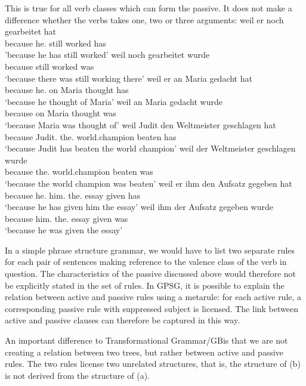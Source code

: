 \noindent
This is true for all verb classes which can form the passive. It does not make a difference whether the verbs takes one, two or three arguments:
\eal
\label{beispiel-arbeiten}
\ex 
\gll weil er noch gearbeitet hat\\
	 because he.\nom{} still worked has\\
\glt 'because he has still worked'
\ex 
\gll weil noch gearbeitet wurde\\
	 because still worked was\\
\glt `because there was still working there'
\zl
\eal
\label{beispiel-denken}
\ex 
\gll weil er an Maria gedacht hat\\
	 because he.\nom{} on Maria thought has\\
\glt `because he thought of Maria'
\ex 
\gll weil an Maria gedacht wurde\\
	 because on Maria thought was\\
\glt `because Maria was thought of'
\zl
\eal
\ex 
\gll weil Judit den Weltmeister geschlagen hat\\
     because Judit.\nom{} the.\acc{} world.champion beaten has\\
\glt `because Judit has beaten the world champion'
\ex 
\gll weil der Weltmeister geschlagen wurde\\
	 because the.\nom{} world.champion beaten was\\
\glt `because the world champion was beaten'
\zl
\eal
\ex 
\gll weil er ihm den Aufsatz gegeben hat\\
     because he.\nom{} him.\dat{} the.\acc{} essay given has\\
\glt `because he has given him the essay'
\ex 
\gll weil ihm der Aufsatz gegeben wurde\\
     because him.\dat{} the.\nom{} essay given was\\
\glt `because he was given the essay'
\zl

\noindent
In a simple phrase structure grammar, we would have to list  two separate rules for each pair of sentences making reference to the valence class of the
verb in question. The characteristics of the passive discussed above would therefore not be
explicitly stated in the set of rules. In GPSG, it is possible to explain the relation between
active and passive rules using a metarule: for each active rule, a corresponding passive rule with suppressed subject is licensed.
The link between active and passive clauses can therefore be captured in this way.  

An important difference to Transformational Grammar/GB\indexgb\indexmp is that we are not creating a
relation between two trees, but rather between active and passive rules. The two rules license two
unrelated structures, that is, the structure of (b) is not derived from the structure of (a). 


